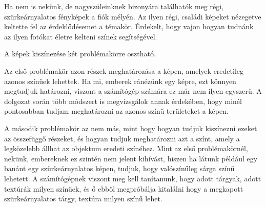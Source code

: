 
Ha nem is nekünk, de nagyszüleinknek bizonyára találhatók meg régi, szürkeárnyalatos fényképek a fiók mélyén. Az ilyen régi, családi képeket nézegetve keltette fel az érdeklődésemet a témakör. Érdekelt, hogy vajon hogyan tudnánk az ilyen fotókat életre kelteni színek segítségével.

A képek kiszínezése két problémakörre osztható. 

Az első problémakör azon részek meghatározása a képen, amelyek eredetileg azonos színűek lehettek. Ha mi, emberek ránézünk egy képre, ezt könnyen megtudjuk határozni, viszont a számítógép számára ez már nem ilyen egyszerű. A dolgozat során több módszert is megvizsgálok annak érdekében, hogy minél pontosabban tudjam meghatározni az azonos színű területeket a képen.

A második problémakör az nem más, mint hogy hogyan tudjuk kiszínezni ezeket az összefüggő részeket, és hogyan tudjuk meghatározni azt a színt, amely a legközelebb állhat az objektum eredeti színéhez. Mint az első problémakörnél, nekünk, embereknek ez szintén nem jelent kihívást, hiszen ha látunk például egy banánt egy szürkeárnyalatos képen, tudjuk, hogy valószínűleg sárga színű lehetett. A számítógépnek viszont meg kell tanítanunk, hogy adott tárgyak, adott textúrák milyen színűek, és ő ebből megpróbálja kitalálni hogy a megkapott szürkeárnyalatos tárgy, textúra milyen színű lehet.
